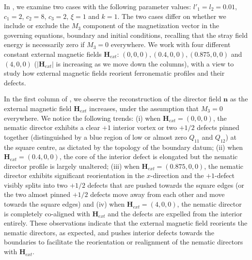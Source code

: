 \documentclass{article}
\def\nvec{\mathbf{n}}
\def\Hvec{\mathbf{H}}
\begin{document}
In , we examine two cases with the following parameter values: $l'_1=l_2=0.01$, $c_1=2$, $c_2=8$, $c_3=2$, $\xi=1$ and $k=1$. The two cases differ on whether we include or exclude the $M_3$ component of the magnetization vector in the governing equations, boundary and initial conditions, recalling that the stray field energy is necessarily zero if $M_3=0$ everywhere. 
We work with four different constant external magnetic fields  $\textbf{H}_{ext}$: $\left(0, 0, 0\right), \left(0.4, 0, 0\right), \left(0.875, 0, 0\right)$ and $\left(4, 0, 0\right)$ ($|\Hvec_{ext}|$ is increasing as we move down the columns), with a view to study how external magnetic fields reorient ferronematic profiles and their defects.



In the first column of , we observe the reconstruction of the director field $\nvec$ as the external magnetic field $\Hvec_{ext}$ increases, under the assumption that $M_3=0$ everywhere. We notice the following trends: (i) when $\Hvec_{ext} = \left(0, 0, 0\right)$, the nematic director exhibits a clear $+1$ interior vortex or two $+1/2$ defects pinned together (distinguished by a blue region of low or almost zero $Q_{11}$ and $Q_{12}$) at the square centre, as dictated by the topology of the boundary datum; (ii) when $\Hvec_{ext} = \left(0.4, 0, 0\right)$, the core of the interior defect is elongated but the nematic director profile is largely unaltered; (iii) when $\Hvec_{ext}=\left(0.875, 0, 0\right)$, the nematic director exhibits significant reorientation in the $x$-direction and the $+1$-defect visibly splits into two $+1/2$ defects that are pushed towards the square edges (or the two almost pinned $+1/2$ defects move away from each other and move towards the square edges) and (iv) when $\Hvec_{ext}=\left(4, 0, 0\right)$, the nematic director is completely co-aligned with $\Hvec_{ext}$ and the defects are expelled from the interior entirely. These observations indicate that the external magnetic field reorients the nematic directors, as expected, and pushes interior defects towards the boundaries to facilitate the reorientation or realignment of the nematic directors with $\Hvec_{ext}$.
\end{document}
